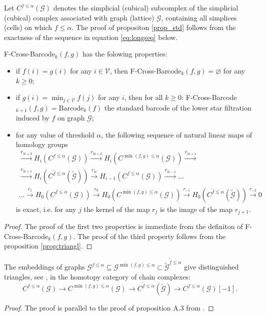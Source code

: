 \documentclass[runningheads]{llncs}
\begin{document}
Let $C^{f\leq\alpha}(\mathcal{G})$ denotes the simplicial (cubical) subcomplex of the simplicial (cubical) complex associated with graph (lattice) $\mathcal{G}$, containing all simplices (cells) on which $f\leq\alpha$. The proof of propositon \ref{prop_std} follows from the exactness of the sequence in equation \ref{eq:longseq} below.
\begin{theorem}\label{thr:basic}{F-Cross-Barcode}$_k(f,g)$ has the folowing properties: 
\begin{itemize}[topsep=0pt,noitemsep,nolistsep, partopsep=0pt, parsep=0ex, leftmargin=*]
\item if $f(i)=g(i)$ for any $i\in \mathcal{V}$, then {F-Cross-Barcode}$_k(f,g)=\varnothing$ for any $k\ge 0$;
\item if $g(i)=\min_{j\in \mathcal{V}}{f(j)}$ for any $i$, then for all $k\ge 0$: {F-Cross-Barcode$_{k+1}(f,g)=\text{Barcode}_{k}(f)$} the standard barcode of the lower star filtration induced by $f$ on graph $\mathcal{G}$;
    \item for any value of threshold $\alpha$, the following sequence of natural linear maps of homology groups
\begin{multline}
    \xrightarrow{r_{3i+3}} H_{i}(C^{f\leq\alpha}(\mathcal{G})) \xrightarrow{r_{3i+2}} H_i(C^{\min(f,g)\leq\alpha}(\mathcal{G}))\xrightarrow{r_{3i+1}}\\ \xrightarrow{r_{3i+1}} H_i(C^{\tilde{f}\leq\alpha}(\tilde{\mathcal{G}})) \xrightarrow{r_{3i}} H_{i-1}(C^{f\leq\alpha}(\mathcal{G}))\xrightarrow{r_{3i-1}}\ldots\\\ldots\xrightarrow{r_1} H_{0}(C^{f\leq\alpha}(\mathcal{G}))\xrightarrow{r_0} H_{0}(C^{\min(f,g)\leq\alpha}(\mathcal{G}))\xrightarrow{r_{-1}}H_0(C^{\tilde{f}\leq\alpha}(\tilde{\mathcal{G}})) \xrightarrow{r_{-2}}0\label{eq:longseq}
\end{multline} is exact, i.e. for any $j$ the kernel of the map $r_{j}$ is the image of the map $r_{j+1}$.
\end{itemize}
\end{theorem}
\begin{proof}
    The proof of the first two properties is immediate from the definiton of F-Cross-Barcode$_{k}(f,g)$. The proof of the third property follows from the proposition \ref{prop:triangl}. 
\end{proof}

\begin{proposition} \label{prop:triangl}
 The embeddings of graphs $\mathcal{G}^{f\leq\alpha}\subseteq \mathcal{G}^{\min(f,g)\leq\alpha}\subset\tilde{\mathcal{G}}^{\tilde{f}\leq\alpha} $
give distinguished triangles, see \cite{gelfand2002methods}, in the homotopy category of chain complexes: \begin{equation}
     C^{{f}\leq\alpha}({\mathcal{G}})\to  C^{\min(f,g)\leq\alpha}(\mathcal{G})\to C^{\tilde{f}\leq\alpha}(\tilde{\mathcal{G}})\to C^{{f}\leq\alpha}({\mathcal{G}})[-1].
     \label{eq:triang1}
\end{equation} 
\begin{proof}
    The proof is parallel to the proof of proposition A.3 from \cite{barannikov2021representation}.
\end{proof}

\end{proposition}
\end{document}
